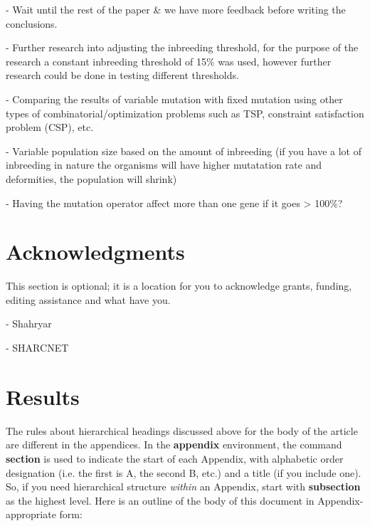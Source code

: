 \documentclass{sig-alternate}
\begin{document}
- Wait until the rest of the paper \& we have more feedback before
  writing the conclusions.

- Further research into adjusting the inbreeding threshold, for the purpose
  of the research a constant inbreeding threshold of 15\% was used, however
  further research could be done in testing different thresholds.

- Comparing the results of variable mutation with fixed mutation using other
  types of combinatorial/optimization problems such as TSP, constraint
  satisfaction problem (CSP), etc.

- Variable population size based on the amount of inbreeding (if you have
  a lot of inbreeding in nature the organisms will have higher mutatation
  rate and deformities, the population will shrink)

- Having the mutation operator affect more than one gene if it goes > 100\%? 

\begin{flushleft}\end{flushleft}



\section{Acknowledgments}
This section is optional; it is a location for you
to acknowledge grants, funding, editing assistance and
what have you.

- Shahryar

- SHARCNET


%

%
%

\appendix
\section{Results}
The rules about hierarchical headings discussed above for
the body of the article are different in the appendices.
In the \textbf{appendix} environment, the command
\textbf{section} is used to
indicate the start of each Appendix, with alphabetic order
designation (i.e. the first is A, the second B, etc.) and
a title (if you include one).  So, if you need
hierarchical structure
\textit{within} an Appendix, start with \textbf{subsection} as the
highest level. Here is an outline of the body of this
document in Appendix-appropriate form:
\end{document}
